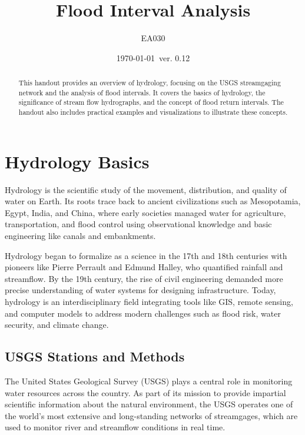 \documentclass{tufte-handout}\usepackage[]{graphicx}\usepackage[]{xcolor}
\title{Flood Interval Analysis}
\author{EA030}
\date{\today~ver. 0.12}
\begin{document}
\maketitle%
\begin{abstract}
\noindent 
This handout provides an overview of hydrology, focusing on the USGS streamgaging network and the analysis of flood intervals. It covers the basics of hydrology, the significance of stream flow hydrographs, and the concept of flood return intervals. The handout also includes practical examples and visualizations to illustrate these concepts.
\end{abstract}



\section{Hydrology Basics}

Hydrology is the scientific study of the movement, distribution, and quality of water on Earth. Its roots trace back to ancient civilizations such as Mesopotamia, Egypt, India, and China, where early societies managed water for agriculture, transportation, and flood control using observational knowledge and basic engineering like canals and embankments.

Hydrology began to formalize as a science in the 17th and 18th centuries with pioneers like Pierre Perrault and Edmund Halley, who quantified rainfall and streamflow. By the 19th century, the rise of civil engineering demanded more precise understanding of water systems for designing infrastructure. Today, hydrology is an interdisciplinary field integrating tools like GIS, remote sensing, and computer models to address modern challenges such as flood risk, water security, and climate change.

\subsection{USGS Stations and Methods}

The United States Geological Survey (USGS) plays a central role in monitoring water resources across the country. As part of its mission to provide impartial scientific information about the natural environment, the USGS operates one of the world’s most extensive and long-standing networks of streamgages, which are used to monitor river and streamflow conditions in real time.
\end{document}
